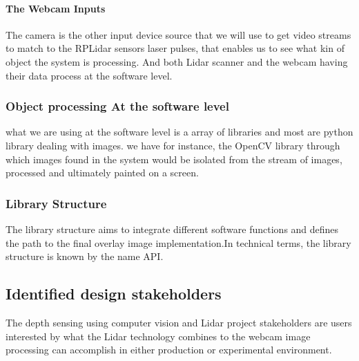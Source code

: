 \documentclass[10pt,draftclsnofoot,onecolumn,journal,compsoc]{IEEEtran}
\begin{document}
    	\paragraph{\textbf{The Webcam Inputs} }
    The camera is the other input device source that we will use to get video streams to match to the RPLidar sensors laser pulses, that enables us to  see what kin of object the system is processing. And both Lidar scanner and the webcam having their data process at the software level.
   
    	\subsubsection{Object processing At the software level}
    	what we are using at the software level is a array of libraries and most are python library dealing with images. we have for instance, the OpenCV library through which images found in the system would be isolated from the stream of images, processed and ultimately painted on a screen.
    	
    	\subsubsection{Library Structure}
    	The library structure aims to integrate different software functions and defines the path to the final overlay image implementation.In technical terms, the library structure is known by the name API.
    	
    \subsection{Identified design stakeholders}
  The depth sensing using computer vision and Lidar project stakeholders are  users interested by what the Lidar technology combines to the webcam image processing can accomplish in either production or experimental environment.   
    
\end{document}
